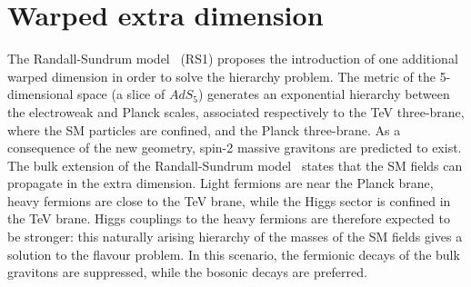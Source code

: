 \newpage
\section{Warped extra dimension}
\label{sec:theory_WED}
The Randall-Sundrum model~\cite{Randall:1999ee,Randall:1999vf} (RS1) proposes the introduction of one additional warped dimension in order to solve the hierarchy problem. The metric of the 5-dimensional space (a slice of $AdS_5$) generates an exponential hierarchy between the electroweak and Planck scales, associated respectively to the TeV three-brane, where the SM particles are confined, and the Planck three-brane. As a consequence of the new geometry, spin-2 massive gravitons are predicted to exist.\\
The bulk extension of the Randall-Sundrum model~\cite{Agashe:2007zd,Fitzpatrick:2007qr} states that the SM fields can propagate in the extra dimension. Light fermions are near the Planck brane, heavy fermions are close to the TeV brane, while the Higgs sector is confined in the TeV brane. Higgs couplings to the heavy fermions are therefore expected to be stronger: this naturally arising hierarchy of the masses of the SM fields gives a solution to the flavour problem. In this scenario, the fermionic decays of the bulk gravitons are suppressed, while the bosonic decays are preferred.

